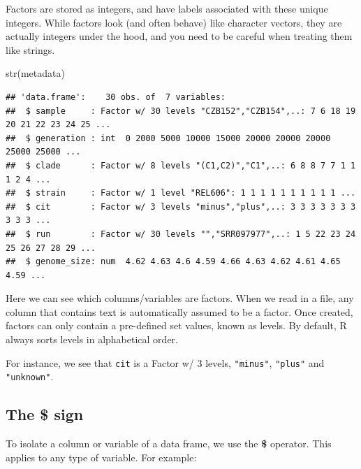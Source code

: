 \documentclass[
]{book}
\newenvironment{Shaded}{\begin{snugshade}}{\end{snugshade}}
\newcommand{\FunctionTok}[1]{\textcolor[rgb]{0.00,0.00,0.00}{#1}}
\newcommand{\NormalTok}[1]{#1}
\newcommand{\SpecialCharTok}[1]{\textcolor[rgb]{0.00,0.00,0.00}{#1}}
\begin{document}
Factors are stored as integers, and have labels associated with these unique integers. While factors look (and often behave) like character vectors, they are actually integers under the hood, and you need to be careful when treating them like strings.

\begin{Shaded}
\begin{Highlighting}[]
\FunctionTok{str}\NormalTok{(metadata)}
\end{Highlighting}
\end{Shaded}

\begin{verbatim}
## 'data.frame':    30 obs. of  7 variables:
##  $ sample     : Factor w/ 30 levels "CZB152","CZB154",..: 7 6 18 19 20 21 22 23 24 25 ...
##  $ generation : int  0 2000 5000 10000 15000 20000 20000 20000 25000 25000 ...
##  $ clade      : Factor w/ 8 levels "(C1,C2)","C1",..: 6 8 8 7 7 1 1 1 2 4 ...
##  $ strain     : Factor w/ 1 level "REL606": 1 1 1 1 1 1 1 1 1 1 ...
##  $ cit        : Factor w/ 3 levels "minus","plus",..: 3 3 3 3 3 3 3 3 3 3 ...
##  $ run        : Factor w/ 30 levels "","SRR097977",..: 1 5 22 23 24 25 26 27 28 29 ...
##  $ genome_size: num  4.62 4.63 4.6 4.59 4.66 4.63 4.62 4.61 4.65 4.59 ...
\end{verbatim}

Here we can see which columns/variables are factors. When we read in a file, any column that contains text is automatically assumed to be a factor. Once created, factors can only contain a pre-defined set values, known as levels. By default, R always sorts levels in alphabetical order.

For instance, we see that \texttt{cit} is a Factor w/ 3 levels, \texttt{"minus"}, \texttt{"plus"} and \texttt{"unknown"}.

\hypertarget{the-sign}{%
\subsection*{The \$ sign}\label{the-sign}}

To isolate a column or variable of a data frame, we use the \textbf{\$} operator. This applies to any type of variable. For example:

\begin{Shaded}
\end{Shaded}
\end{document}
